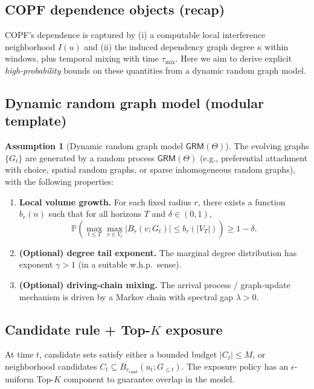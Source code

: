\documentclass[11pt]{article}
\newcommand{\Pp}{\mathbb{P}} %
\newcommand{\1}{\mathbf{1}}
\theoremstyle{plain}
\theoremstyle{definition}
\newtheorem{assumption}[theorem]{Assumption}
\theoremstyle{remark}
\begin{document}
\subsection{COPF dependence objects (recap)}
COPF's dependence is captured by (i) a computable local interference neighborhood $I(u)$ and
(ii) the induced dependency graph degree $\kappa$ within windows, plus temporal mixing with time $\tau_{\mathrm{mix}}$.
Here we aim to derive explicit \emph{high-probability} bounds on these quantities from a dynamic random graph model.

\subsection{Dynamic random graph model (modular template)}
\begin{assumption}[Dynamic random graph model $\mathsf{GRM}(\Theta)$]\label{ass:grm}
The evolving graphs $\{G_t\}$ are generated by a random process $\mathsf{GRM}(\Theta)$
(e.g., preferential attachment with choice, spatial random graphs, or sparse inhomogeneous random graphs),
with the following properties:

\begin{enumerate}[leftmargin=2em]
\item \textbf{Local volume growth.} For each fixed radius $r$, there exists a function $b_r(n)$ such that
for all horizons $T$ and $\delta\in(0,1)$,
\[
\Pp\!\left(\max_{t\le T}\max_{v\in V_t} |B_r(v;G_t)| \le b_r(|V_T|)\right)\ge 1-\delta.
\]
\item \textbf{(Optional) degree tail exponent.} The marginal degree distribution has exponent $\gamma>1$
(in a suitable w.h.p.\ sense).
\item \textbf{(Optional) driving-chain mixing.} The arrival process / graph-update mechanism is driven by
a Markov chain with spectral gap $\lambda>0$.
\end{enumerate}
\end{assumption}

\subsection{Candidate rule + Top-$K$ exposure}
At time $t$, candidate sets satisfy either a bounded budget $|C_t|\le M$,
or neighborhood candidates $C_t\subseteq B_{r_{\mathrm{cand}}}(u_t;G_{\le t})$.
The exposure policy has an $\epsilon$-uniform Top-$K$ component to guarantee overlap in the model.
\end{document}
